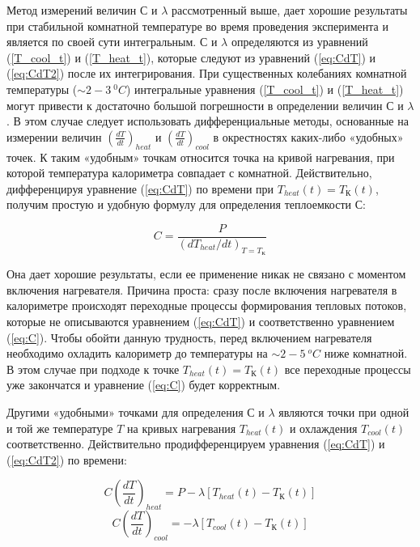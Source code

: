 Метод измерений величин $С$ и $\lambda$ рассмотренный выше, дает хорошие результаты при стабильной комнатной температуре во время проведения эксперимента и является по своей сути интегральным. $С$ и $\lambda$ определяются из уравнений (\ref{T_cool_t}) и (\ref{T_heat_t}), которые следуют из уравнений (\ref{eq:CdT}) и (\ref{eq:CdT2}) после их интегрирования. При существенных колебаниях комнатной температуры ($\sim 2-3~^0C$) интегральные уравнения (\ref{T_cool_t}) и (\ref{T_heat_t}) могут привести к достаточно большой погрешности в определении величин $С$ и $\lambda$. В этом случае следует использовать дифференциальные методы, основанные на измерении величин $\left( \frac{dT}{dt} \right)_{heat}$ и $\left( \frac{dT}{dt} \right)_{cool}$ в окрестностях каких-либо «удобных» точек. К таким «удобным» точкам относится точка на кривой нагревания, при которой температура калориметра совпадает с комнатной. Действительно, дифференцируя уравнение (\ref{eq:CdT}) по времени при $T_{heat}(t) = T_\text{К}(t)$, получим простую и удобную формулу для определения теплоемкости $С$:

\begin{equation}
    C = \frac{P}{(dT_{heat} / dt)_{T = T_\text{К}}}
    \label{eq:C}
\end{equation}

Она дает хорошие результаты, если ее применение никак не связано с моментом включения нагревателя. Причина проста: сразу после включения нагревателя в калориметре происходят переходные процессы формирования тепловых потоков, которые не описываются уравнением (\ref{eq:CdT}) и соответственно уравнением (\ref{eq:C}). Чтобы обойти данную трудность, перед включением нагревателя необходимо охладить калориметр до температуры на $\sim 2-5~^oC$ ниже комнатной. В этом случае при подходе к точке $T_{heat}(t) = T_\text{К}(t)$ все переходные процессы уже закончатся и уравнение (\ref{eq:C}) будет корректным.

Другими «удобными» точками для определения $С$ и $\lambda$ являются точки при одной и той же температуре $T$ на кривых нагревания $T_{heat}(t)$ и охлаждения $T_{cool}(t)$ соответственно. Действительно продифференцируем уравнения (\ref{eq:CdT}) и (\ref{eq:CdT2}) по времени:

\begin{equation}
    C \left( \frac{dT}{dt} \right)_{heat} = P - \lambda \left[ T_{heat}(t) - T_\text{К}(t) \right]
    \label{eq:C_diff_heat}
\end{equation}
\begin{equation}
    C \left( \frac{dT}{dt} \right)_{cool} = - \lambda \left[ T_{cool}(t) - T_\text{К}(t) \right] \label{eq:C_diff_cool}
\end{equation}

